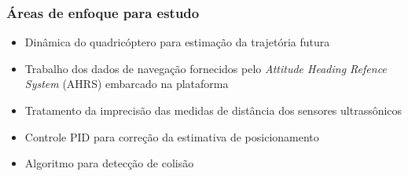 \documentclass{beamer}
\begin{document}
\begin{frame}
	
	\frametitle{Áreas de enfoque para estudo}
	
	\begin{itemize}
		
		\item Dinâmica do quadricóptero para estimação da trajetória futura		
		
		\item Trabalho dos dados de navegação fornecidos pelo \textit{Attitude Heading Refence System} (AHRS) embarcado na plataforma
%		   	
		
		\item Tratamento da imprecisão das medidas de distância dos sensores ultrassônicos 
		
		\item Controle PID para correção da estimativa de posicionamento
		
		\item Algoritmo para detecção de colisão
		
%		
		
	\end{itemize}	

\end{frame}	
\end{document}
